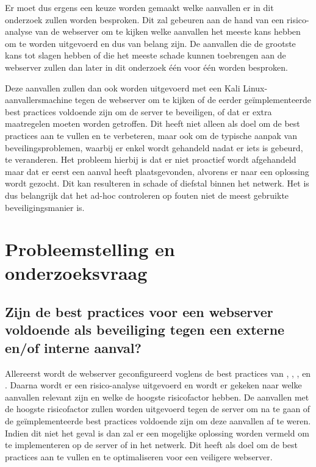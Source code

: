 \documentclass[pdftex,a4paper,12pt]{report}
\begin{document}
Er moet dus ergens een keuze worden gemaakt welke aanvallen er in dit onderzoek zullen worden besproken. Dit zal gebeuren aan de hand van een risico-analyse van de webserver om te kijken welke aanvallen het meeste kans hebben om te worden uitgevoerd en dus van belang zijn. De aanvallen die de grootste kans tot slagen hebben of die het meeste schade kunnen toebrengen aan de webserver zullen dan later in dit onderzoek één voor één worden besproken. \newline 

Deze aanvallen zullen dan ook worden uitgevoerd met een Kali Linux-aanvallersmachine tegen de webserver om te kijken of de eerder geïmplementeerde best practices voldoende zijn om de server te beveiligen, of dat er extra maatregelen moeten worden getroffen. Dit heeft niet alleen als doel om de best practices aan te vullen en te verbeteren, maar ook om de typische aanpak van beveilingsproblemen, waarbij er enkel wordt gehandeld nadat er iets is gebeurd, te veranderen. Het probleem hierbij is dat er niet proactief wordt afgehandeld maar dat er eerst een aanval heeft plaatsgevonden, alvorens er naar een oplossing wordt gezocht. Dit kan resulteren in schade of diefstal binnen het netwerk. Het is dus belangrijk dat het ad-hoc controleren op fouten niet de meest gebruikte beveiligingsmanier is.


\section{Probleemstelling en onderzoeksvraag}
\label{sec:onderzoeksvragen}

\subsection{Zijn de best practices voor een webserver voldoende als beveiliging tegen een externe en/of interne aanval?}

Allereerst wordt de webserver geconfigureerd voglens de best practices van \cite{Cott2012}, \cite{Microsoft2013}, \cite{Poley2013}, \cite{Posey2011} en \cite{Vialle2012}. Daarna wordt er een risico-analyse uitgevoerd en wordt er gekeken naar welke aanvallen relevant zijn en welke de hoogste risicofactor hebben. De aanvallen met de hoogste risicofactor zullen worden uitgevoerd tegen de server om na te gaan of de geïmplementeerde best practices voldoende zijn om deze aanvallen af te weren. Indien dit niet het geval is dan zal er een mogelijke oplossing worden vermeld om te implementeren op de server of in het netwerk. Dit heeft als doel om de best practices aan te vullen en te optimaliseren voor een veiligere webserver.
\end{document}
